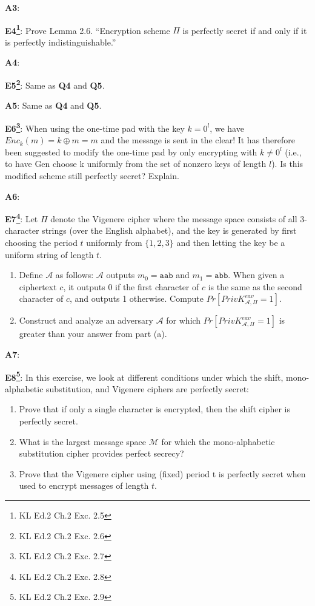 \documentclass[12pt,reqno]{amsart}
\newcommand{\code}[1]{\texttt{#1}}
\newcommand{\msgspc}[0]{\mathcal{M}}
\begin{document}
\textbf{A3}:  


\vspace{20px}
\textbf{E4\footnote{KL Ed.2 Ch.2 Exc. 2.5}}:  Prove Lemma 2.6. ``Encryption scheme $\Pi$ is perfectly secret if and only if it is perfectly indistinguishable.''

\textbf{A4}:  

\vspace{20px}
\textbf{E5\footnote{KL Ed.2 Ch.2 Exc. 2.6}}:  Same as \textbf{Q4} and \textbf{Q5}.

\textbf{A5}:  Same as \textbf{Q4} and \textbf{Q5}.

\vspace{20px}
\textbf{E6\footnote{KL Ed.2 Ch.2 Exc. 2.7}}:  When using the one-time pad with the key $k = 0^l$, we have $Enc_k(m) = k \oplus m = m$ and the message is sent in the clear! It has therefore been
suggested to modify the one-time pad by only encrypting with $k \ne 0^l$ (i.e., to have Gen choose k uniformly from the set of nonzero keys of length $l$). Is this modified scheme still perfectly secret? Explain.

\textbf{A6}:  

\vspace{20px}
\textbf{E7\footnote{KL Ed.2 Ch.2 Exc. 2.8}}:  Let $\Pi$ denote the Vigenere cipher where the message space consists of all 3-character strings (over the English alphabet), and the key is generated by first choosing the period $t$ uniformly from $\{1, 2, 3\}$ and then letting the key be a uniform string of length $t$.
\begin{enumerate}[label=\alph*]
\item Define $\mathcal{A}$ as follows: $\mathcal{A}$ outputs $m_0 = \code{aab}$ and $m_1 = \code{abb}$. When given a ciphertext $c$, it outputs 0 if the first character of $c$ is the same as the second character of $c$, and outputs 1 otherwise. Compute $Pr[PrivK^{eav}_{\mathcal{A},\Pi}=1]$.
\item Construct and analyze an adversary $\mathcal{A}$ for which $Pr[PrivK^{eav}_{\mathcal{A},\Pi}=1]$ is greater than your answer from part (a).
\end{enumerate}

\textbf{A7}:  

\vspace{20px}
\textbf{E8\footnote{KL Ed.2 Ch.2 Exc. 2.9}}:   In this exercise, we look at different conditions under which the shift, mono-alphabetic substitution, and Vigenere ciphers are perfectly secret:
\begin{enumerate}[label=\alph*]
\item  Prove that if only a single character is encrypted, then the shift cipher is perfectly secret.
\item What is the largest message space $\msgspc$ for which the mono-alphabetic substitution cipher provides perfect secrecy?
\item Prove that the Vigenere cipher using (fixed) period t is perfectly secret when used to encrypt messages of length $t$.
\end{enumerate}
\end{document}
